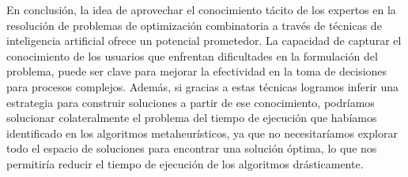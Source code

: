 En conclusión, la idea de aprovechar el conocimiento tácito de los expertos en
la resolución de problemas de optimización combinatoria a través de técnicas de
inteligencia artificial ofrece un potencial prometedor. La capacidad de
capturar el conocimiento de los usuarios que enfrentan dificultades en la
formulación del problema, puede ser clave para mejorar la efectividad en la
toma de decisiones para procesos complejos. Además, si gracias a estas técnicas
logramos inferir una estrategia para construir soluciones a partir de ese
conocimiento, podríamos solucionar colateralmente el problema del tiempo de
ejecución que habíamos identificado en los algoritmos metaheurísticos, ya que
no necesitaríamos explorar todo el espacio de soluciones para encontrar una
solución óptima, lo que nos permitiría reducir el tiempo de ejecución de los
algoritmos drásticamente.

\pagebreak